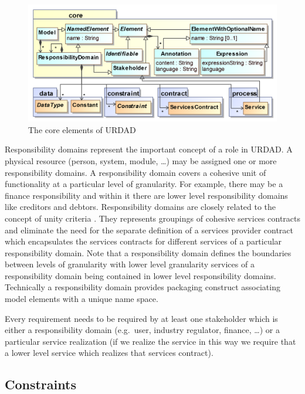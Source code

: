 \begin{figure}
  \centering
  \includegraphics{core}
  \caption{The core elements of URDAD}
  \label{fig:metamodel}
\end{figure}

Responsibility domains represent the important concept of a role in URDAD. A physical resource (person, system, module, \dots) may be assigned one or more responsibility domains. A responsibility domain covers a cohesive unit of functionality at a particular level of granularity. For example, there may be a finance responsibility and within it there are lower level responsibility domains like creditors and debtors.  Responsibility domains are closely related to the concept of unity criteria \cite{gonzalez_unity_2009}. They represents groupings of cohesive services contracts and eliminate the need for the separate definition of a services provider contract which encapsulates the services contracts for different services of a particular responsibility domain. Note that a responsibility domain defines the boundaries between levels of granularity with lower level granularity services of a responsibility domain being contained in lower level responsibility domains. Technically a responsibility domain provides packaging construct associating model elements with a unique name space.

Every requirement needs to be required by at least one stakeholder which is either a responsibility domain (e.g.\ user, industry regulator, finance, \dots) or a particular service realization (if we realize the service in this way we require that a lower level service which realizes that services contract).



\subsection{Constraints}

